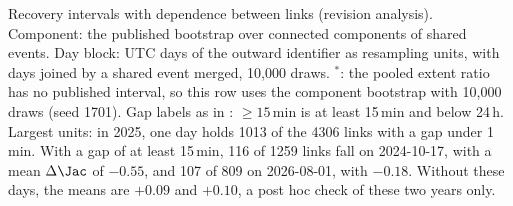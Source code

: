 \begin{table}[h]
\footnotesize
\centering
\caption{Recovery intervals with dependence between links (revision analysis). Component: the published bootstrap over connected components of shared events. Day block: UTC days of the outward identifier as resampling units, with days joined by a shared event merged, 10,000 draws. $^{*}$: the pooled extent ratio has no published interval, so this row uses the component bootstrap with 10,000 draws (seed 1701). Gap labels as in : $\geq 15$\,min is at least 15\,min and below 24\,h. Largest units: in 2025, one day holds \num{1013} of the \num{4306} links with a gap under 1\,min. With a gap of at least 15\,min, 116 of \num{1259} links fall on 2024-10-17, with a mean $\Delta\Jac$ of $-0.55$, and 107 of 809 on 2026-08-01, with $-0.18$. Without these days, the means are $+0.09$ and $+0.10$, a post hoc check of these two years only.}
\label{tab:recovery-dayblock}
\setlength{\tabcolsep}{4pt}

\end{table}

{\let\scriptsize\footnotesize}

